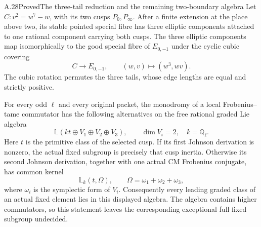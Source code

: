 \begin{statement}{A.28}{Proved}{The three-tail reduction and the remaining two-boundary algebra}
Let $C:v^2=w^7-w$, with its two cusps $P_0,P_\infty$.
After a finite extension at the place above two, its stable pointed
special fibre has three elliptic components attached to one rational
component carrying both cusps. The three elliptic components map
isomorphically to the good special fibre of $E_{0,-1}$ under the
cyclic cubic covering
\[
                C\longrightarrow E_{0,-1},\qquad
                      (w,v)\longmapsto(w^3,wv).
                                                        \tag{A.28.1}
\]
The cubic rotation permutes the three tails, whose edge lengths are
equal and strictly positive.

For every odd $\ell$ and every original packet, the monodromy of a
local Frobenius--tame commutator has the following alternatives on
the free rational graded Lie algebra
\[
           \mathbb L(kt\oplus V_1\oplus V_2\oplus V_3),
           \qquad \dim V_i=2,\quad k=\mathbb Q_\ell.
\]
Here $t$ is the primitive class of the selected cusp. If its first
Johnson derivation is nonzero, the actual fixed subgroup is precisely
that cusp inertia. Otherwise its second Johnson derivation, together
with one actual CM Frobenius conjugate, has common kernel
\[
                         \mathbb L_k(t,\Omega),
              \qquad \Omega=\omega_1+\omega_2+\omega_3,
                                                        \tag{A.28.2}
\]
where $\omega_i$ is the symplectic form of $V_i$.
Consequently every leading graded class of an actual fixed element
lies in this displayed algebra. The algebra contains higher
commutators, so this statement leaves the corresponding exceptional
full fixed subgroup undecided.
\end{statement}
